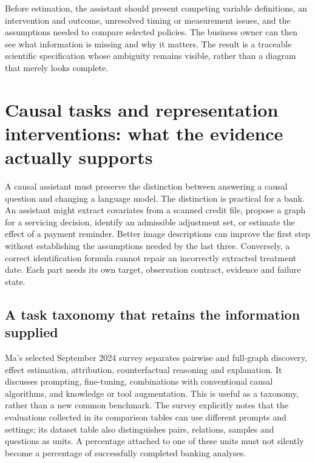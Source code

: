 Before estimation, the assistant should present competing variable definitions, an intervention and outcome, unresolved timing or measurement issues, and the assumptions needed to compare selected policies. The business owner can then see what information is missing and why it matters. The result is a traceable scientific specification whose ambiguity remains visible, rather than a diagram that merely looks complete.


\section[Causal tasks and representation interventions]{Causal tasks and representation interventions: what the evidence actually supports}
\label{sec:exec28-fr}
A causal assistant must preserve the distinction between answering a causal question and changing a language model.
The distinction is practical for a bank. An assistant might extract covariates from a scanned credit file,
propose a graph for a servicing decision, identify an admissible adjustment set, or estimate the effect of a payment reminder.
Better image descriptions can improve the first step without establishing the assumptions needed by the last three.
Conversely, a correct identification formula cannot repair an incorrectly extracted treatment date. Each part needs its own
target, observation contract, evidence and failure state.

\subsection{A task taxonomy that retains the information supplied}
Ma's selected September 2024 survey separates pairwise and full-graph discovery, effect estimation,
attribution, counterfactual reasoning and explanation. It discusses prompting, fine-tuning, combinations with conventional
causal algorithms, and knowledge or tool augmentation. This is useful as a taxonomy, rather than a new common benchmark.
The survey explicitly notes that the evaluations collected in its comparison tables can use different prompts and settings;
its dataset table also distinguishes pairs, relations, samples and questions as units. A percentage attached to one of these
units must not silently become a percentage of successfully completed banking analyses.~\citep{exec28_fr_ma}

